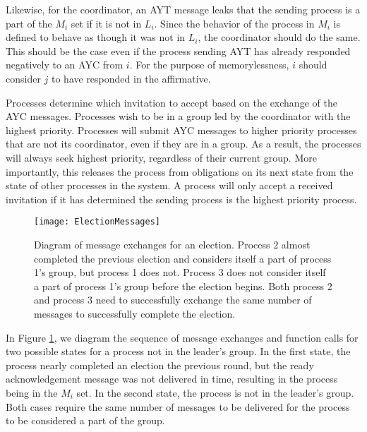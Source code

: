 Likewise, for the coordinator, an \ac{AYT} message leaks that the sending process is a part of the $M_i$ set if it is not in $L_i$.
Since the behavior of the process in $M_i$ is defined to behave as though it was not in $L_i$, the coordinator should do the same.
This should be the case even if the process sending \ac{AYT} has already responded negatively to an \ac{AYC} from $i$.
For the purpose of memorylessness, $i$ should consider $j$ to have responded in the affirmative.

Processes determine which invitation to accept based on the exchange of the \ac{AYC} messages.
Processes wish to be in a group led by the coordinator with the highest priority.
Processes will submit AYC messages to higher priority processes that are not its coordinator, even if they are in a group.
As a result, the processes will always seek highest priority, regardless of their current group.
More importantly, this releases the process from obligations on its next state from the state of other processes in the system.
A process will only accept a received invitation if it has determined the sending process is the highest priority process.

\begin{figure}[h]
\centering
\texttt{[image: ElectionMessages]}
\caption[Diagram of message exchanges for an election.]{Diagram of message exchanges for an election. Process 2 almost completed the previous election and considers itself a part of process 1's group, but process 1 does not. Process 3 does not consider itself a part of process 1's group before the election begins. Both process 2 and process 3 need to successfully exchange the same number of messages to successfully complete the election.}
\label{fig:electionmessages}
\end{figure}

In Figure \ref{fig:electionmessages}, we diagram the sequence of message exchanges and function calls for two possible states for a process not in the leader's group.
In the first state, the process nearly completed an election the previous round, but the ready acknowledgement message was not delivered in time, resulting in the process being in the $M_i$ set.
In the second state, the process is not in the leader's group.
Both cases require the same number of messages to be delivered for the process to be considered a part of the group.


